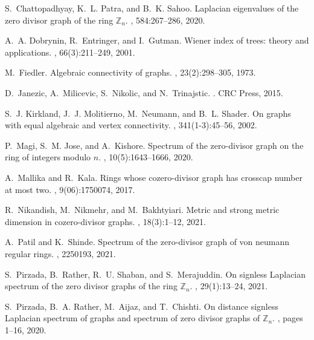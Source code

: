 \documentclass{amsart}
\theoremstyle{plain}
\theoremstyle{definition}
\theoremstyle{remark}
\begin{document}
\begin{thebibliography}{10}
S.~Chattopadhyay, K.~L. Patra, and B.~K. Sahoo.
\newblock Laplacian eigenvalues of the zero divisor graph of the ring
  $\mathbb{Z}_n$.
, 584:267--286, 2020.

A.~A. Dobrynin, R.~Entringer, and I.~Gutman.
\newblock Wiener index of trees: theory and applications.
, 66(3):211--249, 2001.

M.~Fiedler.
\newblock Algebraic connectivity of graphs.
, 23(2):298--305, 1973.

D.~Janezic, A.~Milicevic, S.~Nikolic, and N.~Trinajstic.
.
\newblock CRC Press, 2015.

S.~J. Kirkland, J.~J. Molitierno, M.~Neumann, and B.~L. Shader.
\newblock On graphs with equal algebraic and vertex connectivity.
, 341(1-3):45--56, 2002.

P.~Magi, S.~M. Jose, and A.~Kishore.
\newblock Spectrum of the zero-divisor graph on the ring of integers modulo $n$.
, 10(5):1643--1666, 2020.

A.~Mallika and R.~Kala.
\newblock Rings whose cozero-divisor graph has crosscap number at most two.
,
  9(06):1750074, 2017.

R.~Nikandish, M.~Nikmehr, and M.~Bakhtyiari.
\newblock Metric and strong metric dimension in cozero-divisor graphs.
, 18(3):1--12, 2021.

A.~Patil and K.~Shinde.
\newblock Spectrum of the zero-divisor graph of von neumann regular rings.
, 2250193, 2021.

S.~Pirzada, B.~Rather, R.~U. Shaban, and S.~Merajuddin.
\newblock On signless Laplacian spectrum of the zero divisor graphs of the ring
  $\mathbb{Z}_n$.
, 29(1):13--24, 2021.

S.~Pirzada, B.~A. Rather, M.~Aijaz, and T.~Chishti.
\newblock On distance signless Laplacian spectrum of graphs and spectrum of
  zero divisor graphs of $\mathbb{Z}_n$.
, pages 1--16, 2020.


\end{thebibliography}
\end{document}
